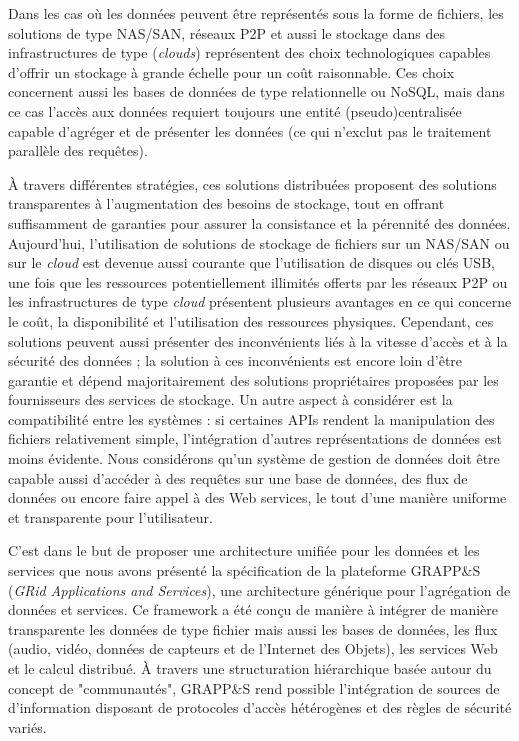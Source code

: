 Dans les cas où les données peuvent être représentés sous la forme de fichiers, les solutions de type NAS/SAN, réseaux P2P et aussi le stockage dans des infrastructures de type (\textit{clouds}) représentent des choix technologiques capables d'offrir un stockage à grande échelle pour un coût raisonnable. Ces choix concernent aussi les bases de données de type relationnelle ou NoSQL, mais dans ce cas l'accès aux données requiert toujours une entité (pseudo)centralisée capable d'agréger et de présenter les données (ce qui n'exclut pas le traitement parallèle des requêtes). 

À travers différentes stratégies, ces solutions distribuées proposent des solutions transparentes à l'augmentation des besoins de stockage, tout en offrant suffisamment de garanties pour assurer la consistance et la pérennité des données. Aujourd'hui, l'utilisation de solutions de stockage de fichiers sur un NAS/SAN ou sur le \textit{cloud} est devenue aussi courante que l'utilisation de disques ou clés USB, une fois que les ressources potentiellement illimités offerts par les réseaux P2P ou les infrastructures de type \textit{cloud} présentent plusieurs avantages en ce qui concerne le coût, la disponibilité et l'utilisation des ressources physiques. Cependant, ces solutions peuvent aussi présenter des inconvénients liés à la vitesse d'accès et à la sécurité des données ; la solution à ces inconvénients est encore loin d'être garantie et dépend majoritairement des solutions propriétaires proposées par les fournisseurs des services de stockage. Un autre aspect à considérer est la compatibilité entre les systèmes : si certaines APIs rendent la manipulation des fichiers relativement simple, l'intégration d'autres représentations de données est moins évidente. Nous considérons qu'un système de gestion de données doit être capable aussi d'accéder à des requêtes sur une base de données, des flux de données ou encore faire appel à des Web services, le tout d'une manière uniforme et transparente pour l'utilisateur.

C'est dans le but de proposer une architecture unifiée pour les données et les services que nous avons présenté la spécification de la plateforme GRAPP\&S (\textit{GRid Applications and Services}), une architecture générique pour l'agrégation de données et services. Ce framework a été conçu de manière à intégrer de manière transparente les données de type fichier mais aussi les bases de données, les flux (audio, vidéo, données de capteurs et de l'Internet des Objets), les services Web et le calcul distribué. À travers une structuration hiérarchique basée autour du concept de "communautés", GRAPP\&S rend possible l'intégration de sources de d'information disposant de protocoles d'accès hétérogènes et des règles de sécurité variés.

